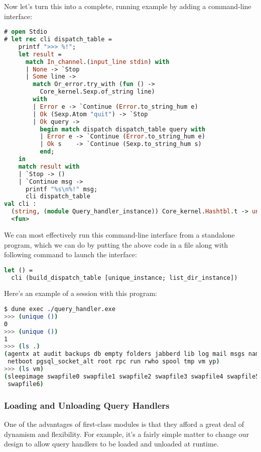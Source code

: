 Now let's turn this into a complete, running example by adding a
command-line interface:

\begin{lstlisting}[language=Caml]
# open Stdio
# let rec cli dispatch_table =
    printf ">>> %!";
    let result =
      match In_channel.(input_line stdin) with
      | None -> `Stop
      | Some line ->
        match Or_error.try_with (fun () ->
          Core_kernel.Sexp.of_string line)
        with
        | Error e -> `Continue (Error.to_string_hum e)
        | Ok (Sexp.Atom "quit") -> `Stop
        | Ok query ->
          begin match dispatch dispatch_table query with
          | Error e -> `Continue (Error.to_string_hum e)
          | Ok s    -> `Continue (Sexp.to_string_hum s)
          end;
    in
    match result with
    | `Stop -> ()
    | `Continue msg ->
      printf "%s\n%!" msg;
      cli dispatch_table
val cli :
  (string, (module Query_handler_instance)) Core_kernel.Hashtbl.t -> unit =
  <fun>
\end{lstlisting}

We can most effectively run this command-line interface from a
standalone program, which we can do by putting the above code in a file
along with following command to launch the interface:

\begin{lstlisting}[language=Caml]
let () =
  cli (build_dispatch_table [unique_instance; list_dir_instance])
\end{lstlisting}

Here's an example of a session with this program:

\begin{lstlisting}[language=bash]
$ dune exec ./query_handler.exe
>>> (unique ())
0
>>> (unique ())
1
>>> (ls .)
(agentx at audit backups db empty folders jabberd lib log mail msgs named
 netboot pgsql_socket_alt root rpc run rwho spool tmp vm yp)
>>> (ls vm)
(sleepimage swapfile0 swapfile1 swapfile2 swapfile3 swapfile4 swapfile5
 swapfile6)
\end{lstlisting}

\hypertarget{loading-and-unloading-query-handlers}{%
\subsubsection{Loading and Unloading Query
Handlers}\label{loading-and-unloading-query-handlers}}

One of the advantages of first-class modules is that they afford a great
deal of dynamism and flexibility. For example, it's a fairly simple
matter to change our design to allow query handlers to be loaded and
unloaded at runtime.

